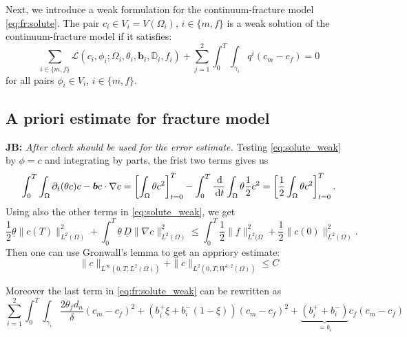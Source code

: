 \documentclass[a4paper]{article}
\def\prtl{\partial}
\def\vc#1{\mathbf{\boldsymbol{#1}}}     %
\def\tn#1{{\mathbb{#1}}}    %
\def\grad{\nabla}
\def\d {\,{\rm d}}
\def\norm#1{\|#1\|}
\def\ul{\underline}
\newcommand{\note}[2]{{\color{blue} \textbf{ #1:} \textit{#2}}}
\begin{document}
Next, we introduce a weak formulation for the continuum-fracture model \eqref{eq:fr:solute}.
The pair $c_i\in V_i = V(\Omega_i)$, $i\in\{m,f\}$ is a weak solution of the continuum-fracture model
if it satisfies:
\begin{equation}
    \label{eq:fr:solute_weak}
    \sum_{i\in \{m,f\}} \mathcal L (c_i, \phi_i; \Omega_i, \theta_i, \vc b_i, \tn D_i, f_i)
    + \sum_{j=1}^2 \int_0^T \int_{\gamma_i} q^i(c_m-c_f) =0
\end{equation}
for all pairs $\phi_i\in V_i$, $i\in\{m,f\}$.



\subsection{A priori estimate for fracture model}
\def\ul{\underline}

\note{JB}{After check should be used for the error estimate.}
Testing \eqref{eq:solute_weak} by $\phi=c$ and integrating by parts, the frist two terms gives us 
\[
    \int_0^T \int_{\Omega} \prtl_t(\theta c)c - \vc b c \cdot \grad c = 
    \left[
        \int_{\Omega} \theta c^2
    \right]_{t=0}^{T}
    -\int_0^T \frac{\d}{\d t} \int_{\Omega} \theta \frac12 c^2 =     
    \left[
        \frac12 \int_{\Omega} \theta c^2
    \right]_{t=0}^{T}.
\] 
Using also the other terms in \eqref{eq:solute_weak}, we get
\begin{equation*}
  \frac12 \ul{\theta}\norm{c(T)}_{L^2(\Omega)}^2 + \int_0^T \ul{\theta}\, \ul{D} \norm{\grad c}_{L^2(\Omega)}^2
  \le \int_0^T \frac12\norm{f}^2_{L^2(\Omega} + \frac12\norm{c(0)}^2_{L^2(\Omega)}.
\end{equation*}
Then one can use Gronwall's lemma to get an appriory estimate:
\[
    \norm{c}_{L^\infty(0,T; L^2(\Omega))} + \norm{c}_{L^2(0,T; W^{1,2}(\Omega))} \le C
\]



Moreover the last term in \eqref{eq:fr:solute_weak} can be rewritten as
\[
   \sum_{i=1}^{2} \int_0^T \int_{\gamma_i} 
   \frac{2\theta_f d_n}{\delta} (c_m - c_f)^2
   + (b_i^+ \xi + b_i^-(1-\xi))(c_m-c_f)^2
   + \underbrace{(b_i^+ + b_i^-)}_{=b_i}c_f(c_m-c_f)
\]
\end{document}
